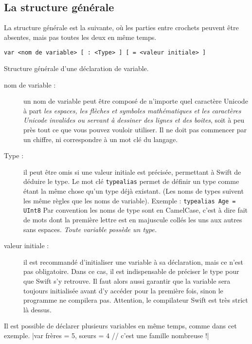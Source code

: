 \subsection{La structure générale}
La structure générale est la suivante,
où les parties entre crochets peuvent être absentes,
mais pas toutes les deux en même temps.

\begin{listing}[h]
\begin{verbatim}
var <nom de variable> [ : <Type> ] [ = <valeur initiale> ]
\end{verbatim}
\caption{Structure générale d'une déclaration de variable.}
\end{listing}

\begin{description}

\item[nom de variable :]
un nom de variable peut être composé de n'importe quel caractère Unicode
à part \emph{les espaces, les flèches et symboles mathématiques et les
caractères Unicode invalides ou servant à dessiner des lignes et des boites},
soit à peu près tout ce que vous pouvez vouloir utiliser.
Il ne doit pas commencer par un chiffre, ni correspondre à un mot clé du langage.


\item[Type :] il peut être omis si une valeur initiale est précisée,
permettant à Swift de déduire le type.
Le mot clé \texttt{typealias} permet de définir un type
comme étant la même chose qu'un type déjà existant.
(Les noms de types suivent les même règles que les noms de variable).
Exemple :
\texttt{typealias Age = UInt8}
Par convention les noms de type sont en CamelCase,
c'est à dire fait de mots dont la première lettre est en majuscule
collés les uns aux autres sans espaces.
\emph{Toute variable possède un type.}

\item[valeur initiale :]
il est recommandé d'initialiser une variable à sa déclaration,
mais ce n'est pas obligatoire.
Dans ce cas, il est indispensable de préciser le type pour que Swift s'y retrouve. 
Il faut alors aussi garantir que la variable sera toujours initialisée
avant d'y accéder pour la première fois, sinon le programme ne compilera pas.
Attention, le compilateur Swift est très strict là dessus.
\end{description}

Il est possible de déclarer plusieurs variables en même temps, comme dans cet exemple.
|var frères = 5, sœurs = 4 // c'est une famille nombreuse !|
